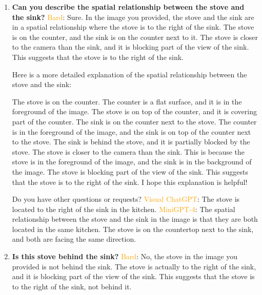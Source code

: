 \begin{enumerate}
    \item \textbf{Can you describe the spatial relationship between the stove and the sink?}
    \subitem \textcolor{orange}{Bard}: 
    Sure. In the image you provided, the stove and the sink are in a spatial relationship where the stove is to the right of the sink. The stove is on the counter, and the sink is on the counter next to it. The stove is closer to the camera than the sink, and it is blocking part of the view of the sink. This suggests that the stove is to the right of the sink.
    
    Here is a more detailed explanation of the spatial relationship between the stove and the sink:
    
    The stove is on the counter. The counter is a flat surface, and it is in the foreground of the image. The stove is on top of the counter, and it is covering part of the counter.
    The sink is on the counter next to the stove. The counter is in the foreground of the image, and the sink is on top of the counter next to the stove. The sink is behind the stove, and it is partially blocked by the stove.
    The stove is closer to the camera than the sink. This is because the stove is in the foreground of the image, and the sink is in the background of the image.
    The stove is blocking part of the view of the sink. This suggests that the stove is to the right of the sink.
    I hope this explanation is helpful!
    
    Do you have other questions or requests?
    \subitem \textcolor{orange}{Visual ChatGPT}: The stove is located to the right of the sink in the kitchen.
    \subitem \textcolor{orange}{MiniGPT-4}: The spatial relationship between the stove and the sink in the image is that they are both located in the same kitchen. The stove is on the countertop next to the sink, and both are facing the same direction.
    \item \textbf{Is this stove behind the sink?}
    \subitem \textcolor{orange}{Bard}: 
    No, the stove in the image you provided is not behind the sink. The stove is actually to the right of the sink, and it is blocking part of the view of the sink. This suggests that the stove is to the right of the sink, not behind it.
    

\end{enumerate}
